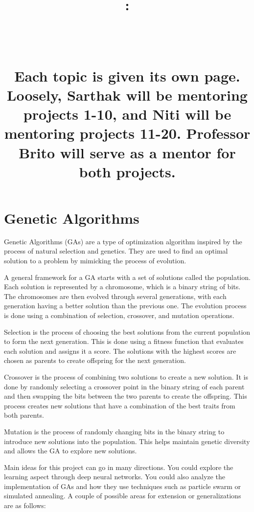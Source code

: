 \documentclass{article}
\title{
    \vspace{2in}
    \textbf{\hmwkClass:\\ \hmwkTitle} \\
    \vspace{0.1in}\large{\textit{\hmwkClassInstructor\ \hmwkSection}} \\
    \vspace{1in}
    \begin{minipage}[t]{0.5\columnwidth}
    {\footnotesize Each topic is given its own page. Loosely, Sarthak will be mentoring projects 1-10, and Niti will be mentoring projects 11-20. Professor Brito will serve as a mentor for both projects.}
    \end{minipage}
    \vspace{1in}
    \author{\textbf{\hmwkAuthorName}}
    \date{}
}
\begin{document}
\maketitle
\pagebreak




\section{Genetic Algorithms}

    Genetic Algorithms (GAs) are a type of optimization algorithm inspired by the process of natural selection and genetics. They are used to find an optimal solution to a problem by mimicking the process of evolution.
    
    \vspace{3mm}
    A general framework for a GA starts with a set of solutions called the population. Each solution is represented by a chromosome, which is a binary string of bits. The chromosomes are then evolved through several generations, with each generation having a better solution than the previous one. The evolution process is done using a combination of selection, crossover, and mutation operations.
    
    \vspace{3mm}
    Selection is the process of choosing the best solutions from the current population to form the next generation. This is done using a fitness function that evaluates each solution and assigns it a score. The solutions with the highest scores are chosen as parents to create offspring for the next generation.
    
    \vspace{3mm}
    Crossover is the process of combining two solutions to create a new solution. It is done by randomly selecting a crossover point in the binary string of each parent and then swapping the bits between the two parents to create the offspring. This process creates new solutions that have a combination of the best traits from both parents.
    
    \vspace{3mm}
    Mutation is the process of randomly changing bits in the binary string to introduce new solutions into the population. This helps maintain genetic diversity and allows the GA to explore new solutions.
    
    \vspace{3mm}
    Main ideas for this project can go in many directions. You could explore the learning aspect through deep neural networks. You could also analyze the implementation of GAs and how they use techniques such as particle swarm or simulated annealing. A couple of possible areas for extension or generalizations are as follows:
    
\end{document}
